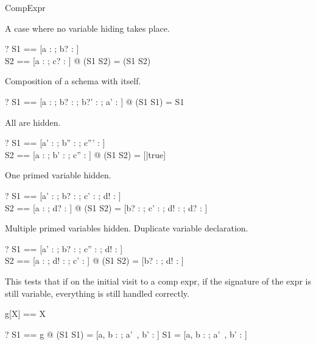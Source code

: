 \begin{zsection}
  \SECTION CompExpr
\end{zsection}

A case where no variable hiding takes place.
\begin{zed}
  \vdash? \exists S1 == [a : \nat; b? : \nat]\\
                  S2 == [a : \nat; c? : \nat] @
                  (S1 \semi S2) = (S1 \land S2)
\end{zed}

Composition of a schema with itself.
\begin{zed}
  \vdash? \exists S1 == [a : \nat; b? : \nat; b?' : \nat; a' : \nat] @
                 (S1 \semi S1) = S1
\end{zed}

All are hidden.
\begin{zed}
  \vdash? \exists S1 == [a' : \nat; b'' : \nat; c''' : \nat]\\
                  S2 == [a : \nat; b' : \nat; c'' : \nat] @
      (S1 \semi S2) = [|true]
\end{zed}

One primed variable hidden.
\begin{zed}
  \vdash? \exists S1 == [a' : \nat; b? : \nat; c' : \nat; d! : \nat]\\
                  S2 == [a : \nat; d? : \nat] @
      (S1 \semi S2) = [b? : \nat; c' : \nat; d! : \nat; d? : \nat]
\end{zed}

Multiple primed variables hidden.
Duplicate variable declaration.
\begin{zed}
  \vdash?
    \exists S1 == [a' : \nat; b? : \nat; c'' : \nat; d! : \nat]\\
            S2 == [a : \nat; d! : \nat; c' : \nat] @
      (S1 \semi S2) = [b? : \nat; d! : \nat]
\end{zed}

This tests that if on the initial visit to a comp expr, if the
signature of the expr is still variable, everything is still handled
correctly.

\begin{zed}
  g[X] == X
\end{zed}

\begin{zed}
  \vdash? \exists S1 == g @
             (S1 \semi S1) = [a, b : \nat; a'~, b' : \nat] \land
             S1 = [a, b : \nat; a'~, b' : \nat]\\
\end{zed}
